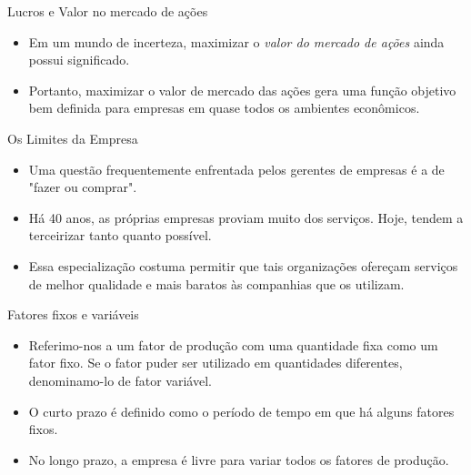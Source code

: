\documentclass[aspectratio=169]{beamer}
\begin{document}
\begin{frame}{Lucros e Valor no mercado de ações}

\begin{block}{ }

\begin{itemize}
    \item Em um mundo de incerteza, maximizar o \textit{valor do mercado de ações} ainda possui significado.
    \item Portanto, maximizar o valor de mercado das ações gera uma função objetivo bem definida para empresas em quase todos os ambientes econômicos.
\end{itemize}

\end{block}
\end{frame}

\begin{frame}{Os Limites da Empresa}

\begin{block}{ }

\begin{itemize}
    \item Uma questão frequentemente enfrentada pelos gerentes de empresas é a de "fazer ou comprar".
    \item Há 40 anos, as próprias empresas proviam muito dos serviços. Hoje, tendem a terceirizar tanto quanto possível.
    \item Essa especialização costuma permitir que tais organizações ofereçam serviços de melhor qualidade e mais baratos às companhias que os utilizam.
\end{itemize}

\end{block}
\end{frame}

\begin{frame}{Fatores fixos e variáveis}

\begin{block}{ }

\begin{itemize}
    \item Referimo-nos a um fator de produção com uma quantidade fixa como um \alert{fator fixo}. Se o fator puder ser utilizado em quantidades diferentes, denominamo-lo de \alert{fator variável}.
    \item O curto prazo é definido como o período de tempo em que há alguns fatores fixos.
    \item No longo prazo, a empresa é livre para variar todos os fatores de produção.
\end{itemize}

\end{block}
\end{frame}
\end{document}
